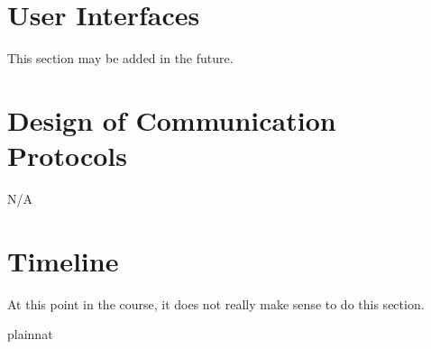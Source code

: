 \documentclass[12pt, titlepage]{article}
\begin{document}
\section{User Interfaces}

This section may be added in the future.

\section{Design of Communication Protocols}

N/A

\section{Timeline}

At this point in the course, it does not really make sense to do this section.

 {plainnat}


\newpage{}
\end{document}
